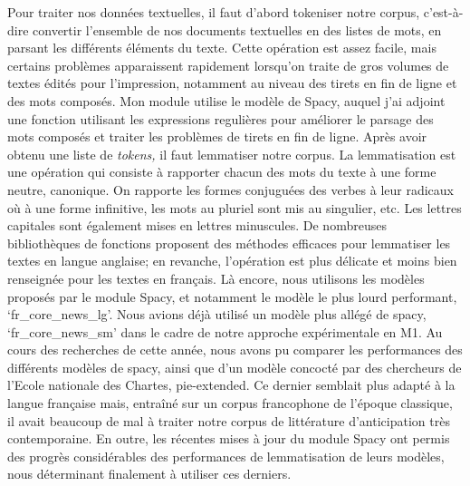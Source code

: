 \documentclass[letterpaper,portrait,12pt]{article}
\begin{document}
	Pour traiter nos donn\'{e}es textuelles, il faut d'abord tokeniser notre corpus, c'est-\`{a}-dire convertir l'ensemble de nos documents textuelles en des listes de mots, en parsant les diff\'{e}rents \'{e}l\'{e}ments du texte. Cette op\'{e}ration est assez facile, mais certains probl\`{e}mes apparaissent rapidement lorsqu'on traite de gros volumes de textes \'{e}dit\'{e}s pour l'impression, notamment au niveau des tirets en fin de ligne et des mots compos\'{e}s. Mon module utilise le mod\`{e}le de Spacy, auquel j'ai adjoint une fonction utilisant les expressions reguli\`{e}res pour am\'{e}liorer le parsage des mots compos\'{e}s et traiter les probl\`{e}mes de tirets en fin de ligne. Apr\`{e}s avoir obtenu une liste de \emph{tokens, }il faut lemmatiser notre corpus.\emph{ }La lemmatisation est une op\'{e}ration qui consiste \`{a} rapporter chacun des mots du texte \`{a} une forme neutre, canonique. On rapporte les formes conjugu\'{e}es des verbes \`{a} leur radicaux où \`{a} une forme infinitive, les mots au pluriel sont mis au singulier, etc. Les lettres capitales sont \'{e}galement mises en lettres minuscules. De nombreuses biblioth\`{e}ques de fonctions proposent des m\'{e}thodes efficaces pour lemmatiser les textes en langue anglaise; en revanche, l'op\'{e}ration est plus d\'{e}licate et moins bien renseign\'{e}e pour les textes en fran\c{c}ais. L\`{a} encore, nous utilisons les mod\`{e}les propos\'{e}s par le module Spacy, et notamment le mod\`{e}le le plus lourd performant, {`}fr\_core\_news\_lg'. Nous avions d\'{e}j\`{a} utilis\'{e} un mod\`{e}le plus all\'{e}g\'{e} de spacy, {`}fr\_core\_news\_sm' dans le cadre de notre approche exp\'{e}rimentale en M1. Au cours des recherches de cette ann\'{e}e, nous avons pu comparer les performances des diff\'{e}rents mod\`{e}les de spacy, ainsi que d'un mod\`{e}le concoct\'{e} par des chercheurs de l'Ecole nationale des Chartes, pie-extended. Ce dernier semblait plus adapt\'{e} \`{a} la langue fran\c{c}aise mais, entra\^{i}n\'{e} sur un corpus francophone de l'\'{e}poque classique, il avait beaucoup de mal \`{a} traiter notre corpus de litt\'{e}rature d'anticipation tr\`{e}s contemporaine. En outre, les r\'{e}centes mises \`{a} jour du module Spacy ont permis des progr\`{e}s consid\'{e}rables des performances de lemmatisation de leurs mod\`{e}les, nous d\'{e}terminant finalement \`{a} utiliser ces derniers.
\end{document}
